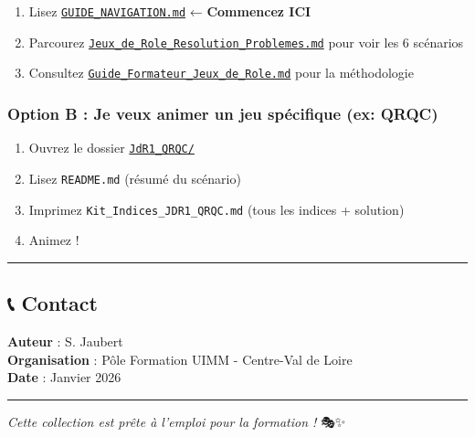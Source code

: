 \documentclass[
]{article}
\providecommand{\tightlist}{%
  \setlength{\itemsep}{0pt}\setlength{\parskip}{0pt}}
\begin{document}
\begin{enumerate}
\def\labelenumi{\arabic{enumi}.}
\tightlist
\item
  Lisez \href{./GUIDE_NAVIGATION.md}{\texttt{GUIDE\_NAVIGATION.md}} ←
  \textbf{Commencez ICI}
\item
  Parcourez
  \href{./Jeux_de_Role_Resolution_Problemes.md}{\texttt{Jeux\_de\_Role\_Resolution\_Problemes.md}}
  pour voir les 6 scénarios
\item
  Consultez
  \href{./Guide_Formateur_Jeux_de_Role.md}{\texttt{Guide\_Formateur\_Jeux\_de\_Role.md}}
  pour la méthodologie
\end{enumerate}

\subsubsection{Option B : Je veux animer un jeu spécifique (ex:
QRQC)}\label{option-b-je-veux-animer-un-jeu-spuxe9cifique-ex-qrqc}

\begin{enumerate}
\def\labelenumi{\arabic{enumi}.}
\tightlist
\item
  Ouvrez le dossier \href{./JdR1_QRQC/}{\texttt{JdR1\_QRQC/}}
\item
  Lisez \texttt{README.md} (résumé du scénario)
\item
  Imprimez \texttt{Kit\_Indices\_JDR1\_QRQC.md} (tous les indices +
  solution)
\item
  Animez !
\end{enumerate}

\begin{center}\rule{0.5\linewidth}{0.5pt}\end{center}

\subsection{📞 Contact}\label{contact}

\textbf{Auteur} : S. Jaubert\\
\textbf{Organisation} : Pôle Formation UIMM - Centre-Val de Loire\\
\textbf{Date} : Janvier 2026

\begin{center}\rule{0.5\linewidth}{0.5pt}\end{center}

\emph{Cette collection est prête à l'emploi pour la formation !} 🎭✨
\end{document}
